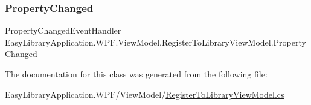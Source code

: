 \subsubsection{\texorpdfstring{Property\+Changed}{PropertyChanged}}
{\footnotesize\ttfamily Property\+Changed\+Event\+Handler Easy\+Library\+Application.\+W\+P\+F.\+View\+Model.\+Register\+To\+Library\+View\+Model.\+Property\+Changed}



The documentation for this class was generated from the following file\+:\begin{DoxyCompactItemize}
\item 
Easy\+Library\+Application.\+W\+P\+F/\+View\+Model/\mbox{\hyperlink{_register_to_library_view_model_8cs}{Register\+To\+Library\+View\+Model.\+cs}}\end{DoxyCompactItemize}
